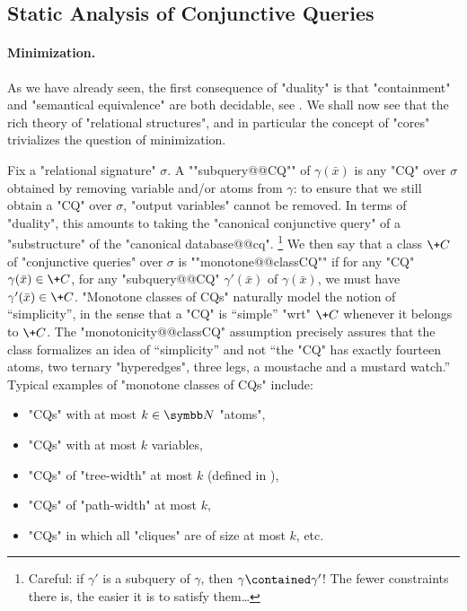 \subsection{Static Analysis of Conjunctive Queries}
\label{sec:prelim-db-static-analysis-cq}

\paragraph*{Minimization.}
As we have already seen, the first consequence of "duality" is that
"containment" and "semantical equivalence" are both
decidable, see .
We shall now see that the rich theory of "relational structures",
and in particular the concept of "cores" trivializes the question of minimization.

Fix a "relational signature" $\sigma$.
A ""subquery@@CQ"" of $\gamma(\bar x)$ is any "CQ" over $\sigma$
obtained by removing variable and/or atoms from $\gamma$:
to ensure that we still obtain a "CQ" over $\sigma$, "output variables" 
cannot be removed.
In terms of "duality", this amounts to taking the "canonical conjunctive query" of
a "substructure" of the "canonical database@@cq".%
\footnote{Careful: if $\gamma'$ is a subquery of $\gamma$, then $\gamma \contained \gamma'$!
The fewer constraints there is, the easier it is to satisfy them…}
We then say that a class $\+C$ of "conjunctive queries" over $\sigma$ is ""monotone@@classCQ""
if for any "CQ" $\gamma(\bar x) \in \+C$, for any "subquery@@CQ" $\gamma'(\bar x)$ of
$\gamma(\bar x)$, we must have $\gamma'(\bar x) \in \+C$.
"Monotone classes of CQs" naturally model the notion of ``simplicity'', in the sense that
a "CQ" is ``simple'' "wrt" $\+C$ whenever it belongs to $\+C$. The "monotonicity@@classCQ"
assumption precisely assures that the class formalizes an idea of ``simplicity''
and not ``the "CQ" has exactly fourteen atoms, two ternary "hyperedges", three legs,
a moustache and a mustard watch.''
Typical examples of "monotone classes of CQs" include:
\begin{itemize}
	\item "CQs" with at most $k \in \N$ "atoms",
	\item "CQs" with at most $k$ variables,
	\item "CQs" of "tree-width" at most $k$ (defined in ),
	\item "CQs" of "path-width" at most $k$,
	\item "CQs" in which all "cliques" are of size at most $k$, etc.
\end{itemize}

